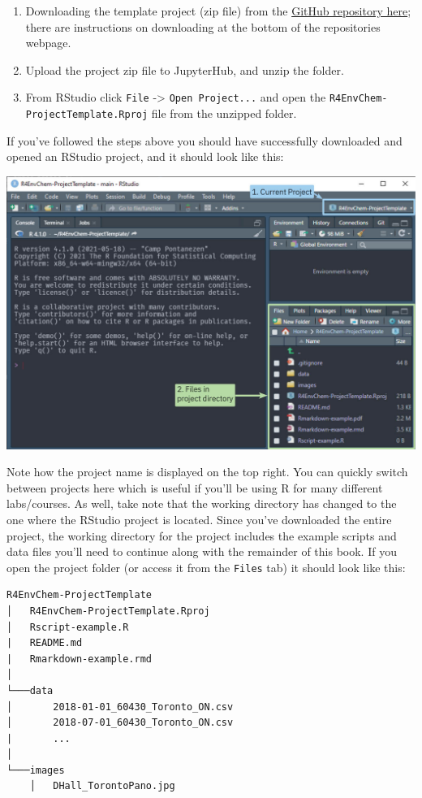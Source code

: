 \documentclass[
]{book}
\providecommand{\tightlist}{%
  \setlength{\itemsep}{0pt}\setlength{\parskip}{0pt}}
\begin{document}
\begin{enumerate}
\def\labelenumi{\arabic{enumi}.}
\tightlist
\item
  Downloading the template project (zip file) from the \href{https://github.com/DavidRossHall/R4EnvChem-ProjectTemplate}{GitHub repository here}; there are instructions on downloading at the bottom of the repositories webpage.
\item
  Upload the project zip file to JupyterHub, and unzip the folder.
\item
  From RStudio click \texttt{File} -\textgreater{} \texttt{Open\ Project...} and open the \texttt{R4EnvChem-ProjectTemplate.Rproj} file from the unzipped folder.
\end{enumerate}

If you've followed the steps above you should have successfully downloaded and opened an RStudio project, and it should look like this:

\includegraphics{images/r-project-open.jpg}

Note how the project name is displayed on the top right. You can quickly switch between projects here which is useful if you'll be using R for many different labs/courses. As well, take note that the working directory has changed to the one where the RStudio project is located. Since you've downloaded the entire project, the working directory for the project includes the example scripts and data files you'll need to continue along with the remainder of this book. If you open the project folder (or access it from the \texttt{Files} tab) it should look like this:

\begin{verbatim}
R4EnvChem-ProjectTemplate
│   R4EnvChem-ProjectTemplate.Rproj
│   Rscript-example.R
|   README.md
|   Rmarkdown-example.rmd
│
└───data
│       2018-01-01_60430_Toronto_ON.csv
│       2018-07-01_60430_Toronto_ON.csv
|       ...
│    
└───images
    │   DHall_TorontoPano.jpg
\end{verbatim}
\end{document}
